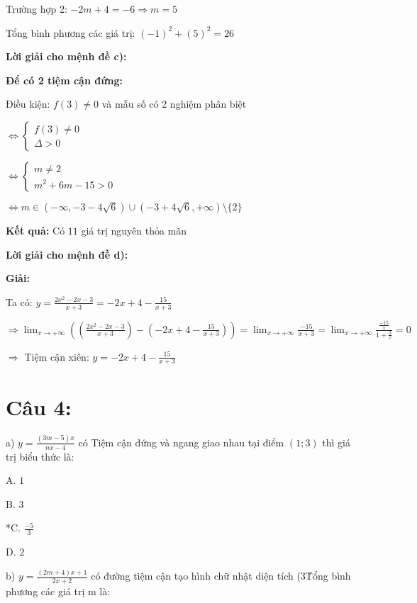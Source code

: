 \documentclass{article}
\begin{document}
Trường hợp 2: \(-2m + 4 = -6 \Rightarrow m = 5\)

Tổng bình phương các giá trị: \((-1)^2 + (5)^2 = 26\)

\textbf{Lời giải cho mệnh đề c):}

\textbf{Để có 2 tiệm cận đứng:}

Điều kiện: \(f(3) \neq 0\) và mẫu số có 2 nghiệm phân biệt

\(\Leftrightarrow \begin{cases}
f(3) \neq 0 \\
\Delta > 0
\end{cases}\)

\(\Leftrightarrow \begin{cases}
m \neq 2 \\
m^2 + 6m - 15 > 0
\end{cases}\)

\(\Leftrightarrow m \in (-\infty, -3 - 4\sqrt{6}) \cup (-3 + 4\sqrt{6}, +\infty) \setminus \{2\}\)

\textbf{Kết quả:} Có \(11\) giá trị nguyên thỏa mãn

\textbf{Lời giải cho mệnh đề d):}

\textbf{Giải:}

Ta có: \(y = \frac{2x^2 - 2x - 3}{x + 3} = -2x + 4 - \frac{15}{x + 3}\)

\(\Rightarrow \displaystyle\lim_{x \to +\infty} \left(\left(\frac{2x^2 - 2x - 3}{x + 3}\right) - \left(-2x + 4 - \frac{15}{x + 3}\right)\right) = \displaystyle\lim_{x \to +\infty} \frac{-15}{x + 3} = \displaystyle\lim_{x \to +\infty} \frac{\frac{-15}{x}}{1 + \frac{3}{x}} = 0\)

\(\Rightarrow\) Tiệm cận xiên: \(y = -2x + 4 - \frac{15}{x + 3}\)



\newpage

\section*{Câu 4:}

a) \(y = \frac{(3m - 5)x}{nx - 4}\) có Tiệm cận đứng và ngang giao nhau tại điểm \((1; 3)\) thì giá trị biểu thức là:

A. \(1\)

B. \(3\)

*C. \(\frac{-5}{3}\)

D. \(2\)


b) \(y = \frac{(2m + 4)x + 1}{2x + 2}\) có đường tiệm cận tạo hình chữ nhật diện tích (3\. Tổng bình phương các giá trị m là:
\end{document}
